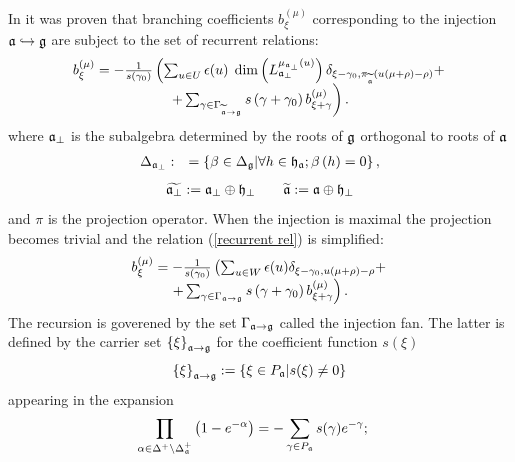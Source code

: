 \documentclass[12pt]{article}
\begin{document}
In \cite
{2010arXiv1007.0318L} it was proven that branching coefficients $b_{\xi
}^{\left( \mu \right) }$ corresponding to the injection $\frak{a}%
\hookrightarrow \frak{g}$ are subject to the set of recurrent relations:
\begin{equation}
\begin{array}{c}
b_{\xi }^{\left( \mu \right) }=-\frac{1}{s\left( \gamma _{0}\right) }\left(
\sum_{u\in U}\epsilon (u)\;\dim \left( L_{\frak{a}_{\perp }}^{\mu _{\frak{a}%
_{\perp }}\left( u\right) }\right) \delta _{\xi -\gamma _{0},\pi _{%
\widetilde{\frak{a}}}(u(\mu +\rho )-\rho )}+\right.  \\
\left. +\sum_{\gamma \in \Gamma _{\widetilde{\frak{a}}\rightarrow \frak{g}%
}}s\left( \gamma +\gamma _{0}\right) b_{\xi +\gamma }^{\left( \mu \right)
}\right) .
\end{array}
\label{recurrent rel}
\end{equation}
where $\frak{a}_{\perp }$ is the subalgebra determined by the roots of $\frak{g}$ orthogonal to roots of $\frak{a}$
\begin{eqnarray}
\Delta _{\frak{a}_{\perp }} &:&=\left\{ \beta \in \Delta _{\frak{g}}|\forall
h\in \frak{h}_{\frak{a}};\beta \left( h\right) =0\right\} ,
\label{delta a ort}
\end{eqnarray}
\begin{eqnarray}
\widetilde{\frak{a}_{\perp }} :=\frak{a}_{\perp }\oplus \frak{h}_{\perp }
\qquad
\widetilde{\frak{a}} :=\frak{a}\oplus \frak{h}_{\perp }
\end{eqnarray}
and $\pi$ is the projection operator. When the injection is maximal the projection becomes trivial and the relation (\ref{recurrent rel}) is simplified:
\begin{equation}
\begin{array}{c}
b_{\xi }^{\left( \mu \right) }=-\frac{1}{s\left( \gamma _{0}\right) }\left(
\sum_{u\in W}\epsilon (u) \delta _{\xi -\gamma _{0}, u(\mu +\rho )-\rho }+\right.  \\
\left. +\sum_{\gamma \in \Gamma _{\frak{a}\rightarrow \frak{g}%
}}s\left( \gamma +\gamma _{0}\right) b_{\xi +\gamma }^{\left( \mu \right)
}\right) .
\end{array}
\label{recurrent relation max}
\end{equation}
The recursion is goverened by the set $\Gamma _{\frak{a}%
\rightarrow \frak{g}}$ called the injection fan. The latter is defined by the
carrier set $\left\{ \xi \right\} _{\frak{a}\rightarrow \frak{g}}$ for the
coefficient function $s(\xi )$
\begin{equation*}
\left\{ \xi \right\} _{\frak{a}\rightarrow \frak{g}}:=\left\{
\xi \in P_{\frak{a}}|s(\xi )\neq 0\right\}
\end{equation*}
appearing in the expansion
\begin{equation}
\prod_{\alpha \in \Delta ^{+}\setminus \Delta _{\frak{a}}^{+}}\left( 1-e^{
-\alpha }\right) =-\sum_{\gamma \in P_{%
\frak{a}}}s(\gamma )e^{-\gamma };\quad
\label{product}
\end{equation}
\end{document}
